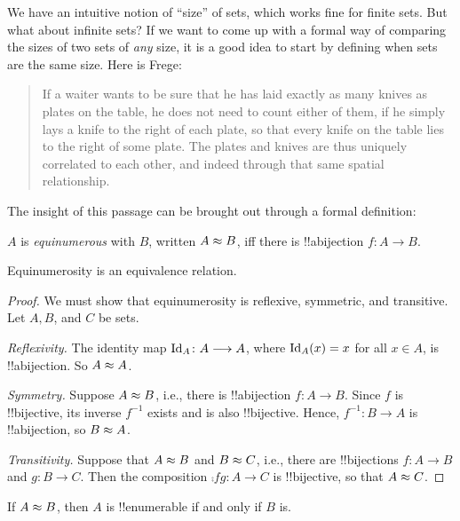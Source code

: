 \documentclass[../../../include/open-logic-section]{subfiles}
\begin{document}


We have an intuitive notion of ``size'' of sets, which works fine for
finite sets. But what about infinite sets? If we want to come up with
a formal way of comparing the sizes of two sets of \emph{any} size, it
is a good idea to start by defining when sets are the same size. Here
is Frege:
\begin{quote}
  If a waiter wants to be sure that he has laid exactly as many knives
  as plates on the table, he does not need to count either of them, if
  he simply lays a knife to the right of each plate, so that every
  knife on the table lies to the right of some plate. The plates and
  knives are thus uniquely correlated to each other, and indeed
  through that same spatial relationship. \citep[\S70]{Frege1884}
\end{quote}
The insight of this passage can be brought out through a formal
definition:

\begin{defn}
  $A$ is \emph{equinumerous} with $B$, written $A \approx B$, iff
  there is !!a{bijection} $f \colon A \to B$. 
\end{defn}

\begin{prop}
Equinumerosity is an equivalence relation.
\end{prop}

\begin{proof} 
We must show that equinumerosity is reflexive, symmetric, and
transitive. Let $A, B$, and $C$ be sets.

\emph{Reflexivity.} The identity map $\mathord{\mathrm{Id}_{A}} \colon A \longrightarrow A$, where
$\mathord{\mathrm{Id}_{A}} (x) = x$ for all $x \in A$, is !!a{bijection}. So
$A \approx A$.

\emph{Symmetry.} Suppose $A \approx B$, i.e., there is
!!a{bijection} $f\colon A \to B$. Since $f$ is !!{bijective}, its
inverse $f^{-1}$ exists and is also !!{bijective}. Hence,
$f^{-1}\colon B \to A$ is !!a{bijection}, so $B \approx A$.

\emph{Transitivity.} Suppose that $A \approx B$ and $B \approx C$,
i.e., there are !!{bijection}s $f\colon A \to B$ and $g\colon B \to
C$. Then the composition $\comp{f}{g}\colon A \to C$ is !!{bijective},
so that $A \approx C$.
\end{proof}

\begin{prop}
If $A \approx B$, then $A$ is !!{enumerable} if
and only if $B$ is.
\end{prop}
\end{document}
